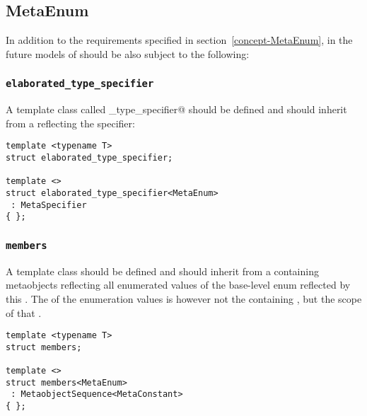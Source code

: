 \subsection{MetaEnum}

In addition to the requirements specified in section~\ref{concept-MetaEnum},
in the future models of  should be also subject to the following:

\subsubsection{\texttt{elaborated\_type\_specifier}}

A template class called \verb@elaborated_type_specifier@ should be defined and should inherit from
a  reflecting the \verb@enum@ specifier:

\begin{verbatim}
template <typename T>
struct elaborated_type_specifier;

template <>
struct elaborated_type_specifier<MetaEnum>
 : MetaSpecifier
{ };
\end{verbatim}

\subsubsection{\texttt{members}}

A template class \verb@members@ should be defined and should inherit from a
 containing   metaobjects
reflecting all enumerated values of the base-level enum reflected by
this . The \verb@scope@ of the enumeration values is however not the
containing \verb@enum@, but the scope of that \verb@enum@.

\begin{verbatim}
template <typename T>
struct members;

template <>
struct members<MetaEnum>
 : MetaobjectSequence<MetaConstant>
{ };
\end{verbatim}

